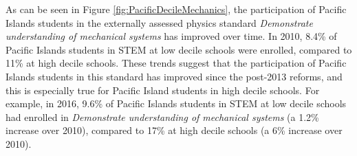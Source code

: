 As can be seen in Figure \ref{fig:PacificDecileMechanics}, the participation of Pacific Islands students in the externally assessed physics standard \textit{Demonstrate understanding of mechanical systems} has improved over time. In 2010, 8.4\% of Pacific Islands students in STEM at low decile schools were enrolled, compared to 11\% at high decile schools. These trends suggest that the participation of Pacific Islands students in this standard has improved since the post-2013 reforms, and this is especially true for Pacific Island students in high decile schools. For example, in 2016, 9.6\% of Pacific Islands students in STEM at low decile schools had enrolled in \textit{Demonstrate understanding of mechanical systems} (a 1.2\% increase over 2010), compared to 17\% at high decile schools (a 6\% increase over 2010). 

